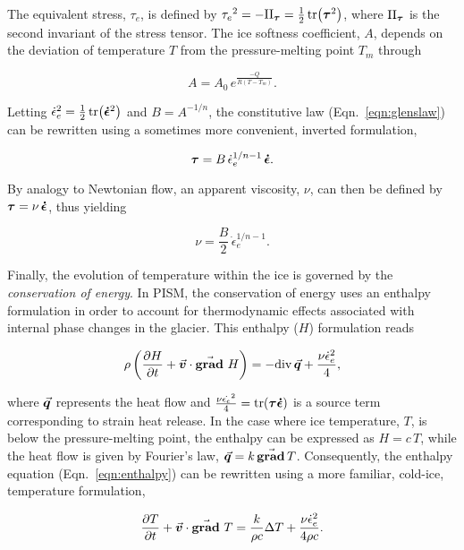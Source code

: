 \documentclass{article}
\newcommand{\vect}[1]{\va*{#1}} %
\newcommand{\tens}[1]{\vb*{#1}} %
\renewcommand{\div}[1]{\mathrm{div}\,#1}            %
\renewcommand{\grad}[1]{\vect{\mathrm{grad}}\,#1}   %
\newcommand{\matdv}[1]{\pdv{#1}{t}+\vect{v}\cdot\grad{}\,#1}  %
\newcommand{\doteps}[0]{\dot{\epsilon}} %
\newcommand{\DST}[0]{\tens{\tau}}       %
\newcommand{\SRT}[0]{\tens{\doteps}}    %
\newcommand{\eqn}[1]{Eqn.~\ref{eqn:#1}}
\begin{document}
The equivalent stress, $\tau_e$, is defined by
${\tau_e}^2 = -\mathrm{II}_{\DST} = \frac{1}{2} \tr(\DST^2)$,
where $\mathrm{II}_{\DST}$ is the second invariant of the stress tensor.
The ice softness coefficient, $A$, depends on the deviation of temperature $T$
from the pressure-melting point $T_m$ through

\begin{equation}
    A = A_0\,e^\frac{-Q}{R(T-T_m)}.
\end{equation}

Letting ${\doteps_e}^2 = \frac{1}{2} \tr(\SRT^2)$ and
$B=A^{-1/n}$, the constitutive law (\eqn{glenslaw}) can be rewritten using a
sometimes more convenient, inverted formulation,

\begin{equation}
    \DST = B\,\doteps_e^{1/n-1}\,\SRT.
\end{equation}

By analogy to Newtonian flow, an apparent viscosity, $\nu$, can then be defined
by $\DST = \nu\,\SRT$, thus yielding

\begin{equation}
    \label{eqn:viscosity}
    \nu = \frac{B}{2}\,\doteps_e^{1/n-1}.
\end{equation}

Finally, the evolution of temperature within the ice is governed by the
\emph{conservation of energy}. In PISM, the conservation of energy uses an
enthalpy formulation in order to account for thermodynamic effects associated
with internal phase changes in the glacier. This enthalpy ($H$) formulation
reads

\begin{equation}
    \label{eqn:enthalpy}
    \rho \left(\matdv{H}\right)
        = -\div{\vect{q}} + \frac{\nu\doteps_e^2}{4},
\end{equation}


where $\vect{q}$ represents the heat flow and
${\frac{\nu\dot{\epsilon_e}^2}{4} = \tr(\DST\SRT)}$ is a
source term corresponding to strain heat release. In the case where ice
temperature, $T$, is below the pressure-melting point, the enthalpy can be
expressed as $H=c\,T$, while the heat flow is given by Fourier's law,
$\vect{q} = k\,\grad{T}$. Consequently, the enthalpy equation (\eqn{enthalpy})
can be rewritten using a more familiar, cold-ice, temperature formulation,

\begin{equation}
    \label{eqn:temperature}
    \matdv{T} = \frac{k}{\rho c} \Delta T
                + \frac{\nu\doteps_e^2}{4\rho c}.
\end{equation}
\end{document}
